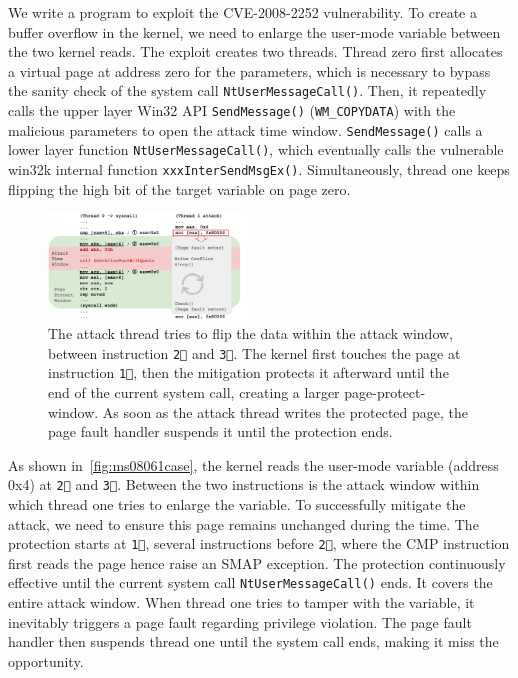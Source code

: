 We write a program to exploit the CVE-2008-2252 vulnerability. To create a buffer overflow in the kernel, we need to enlarge the user-mode variable between the two kernel reads.  The exploit creates two threads. Thread zero first allocates a virtual page at address zero for the parameters, which is necessary to bypass the sanity check of the system call \texttt{NtUserMessageCall()}. Then, it repeatedly calls the upper layer Win32 API \texttt{SendMessage()} (\texttt{WM\_COPYDATA}) with the malicious parameters to open the attack time window. \texttt{SendMessage()} calls a lower layer function \texttt{NtUserMessageCall()}, which eventually calls the vulnerable win32k internal function \texttt{xxxInterSendMsgEx()}. Simultaneously, thread one keeps flipping the high bit of the target variable on page zero.

\begin{figure}[th]
  \includegraphics[width=0.47\textwidth]{figures/ms08061case2}
  \centering
  \caption{The attack thread tries to flip the data within the attack window, between instruction \texttt{\textcircled{2}} and \texttt{\textcircled{3}}. The kernel first touches the page at instruction \texttt{\textcircled{1}}, then the mitigation protects it afterward until the end of the current system call, creating a larger page-protect-window. As soon as the attack thread writes the protected page, the page fault handler suspends it until the protection ends.}
  \label{fig:ms08061case}
\end{figure}



As shown in~\autoref{fig:ms08061case}, the kernel reads the user-mode variable (address 0x4) at \texttt{\textcircled{2}} and \texttt{\textcircled{3}}. Between the two instructions is the attack window within which thread one tries to enlarge the variable. To successfully mitigate the attack, we need to ensure this page remains unchanged during the time. The protection starts at \texttt{\textcircled{1}}, several instructions before \texttt{\textcircled{2}}, where the CMP instruction first reads the page hence raise an SMAP exception. The protection continuously effective until the current system call \texttt{NtUserMessageCall()} ends. It covers the entire attack window. When thread one tries to tamper with the variable, it inevitably triggers a page fault regarding privilege violation. The page fault handler then suspends thread one until the system call ends, making it miss the opportunity.



